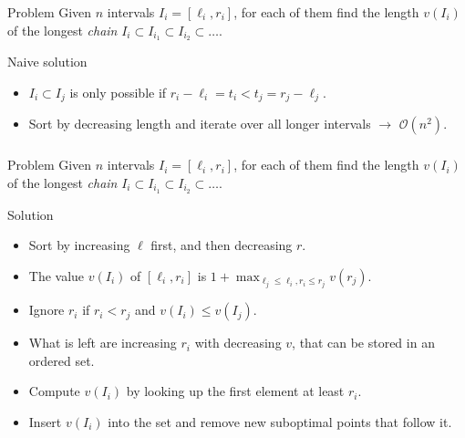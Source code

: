 \begin{frame}
    \frametitle{\problemtitle}
    \begin{block}{Problem}
      Given $n$ intervals $I_i=[\ell_i, r_i]$, for each of them find the length
      $v(I_i)$ of
      the longest \emph{chain} $I_i \subset I_{i_1} \subset I_{i_2}\subset \dots$.
    \end{block}
    \pause
    \begin{block}{Naive solution}
        \begin{itemize}
          \item<+-> $I_i \subset I_j$ is only possible if
             $r_i-\ell_i=t_i < t_j = r_j - \ell_j$.
          \item<+-> Sort by decreasing length and iterate over all longer
             intervals $\rightarrow$ $\mathcal O(n^2)$.
        \end{itemize}
    \end{block}
\end{frame}

\begin{frame}
    \frametitle{\problemtitle}
    \begin{block}{Problem}
      Given $n$ intervals $I_i=[\ell_i, r_i]$, for each of them find the length
      $v(I_i)$ of
      the longest \emph{chain} $I_i \subset I_{i_1} \subset I_{i_2}\subset \dots$.
    \end{block}
    \begin{block}{Solution}
        \begin{itemize}
          \item<+-> Sort by increasing $\ell$ first, and then decreasing $r$.
          \item<+-> The value $v(I_i)$ of $[\ell_i, r_i]$ is $1+\max_{\ell_j \leq \ell_i, r_i \leq r_j} v(r_j)$.
          \item<+-> Ignore $r_i$ if $r_i < r_j$ and $v(I_i) \leq v(I_j)$.
          \item<+-> What is left are increasing $r_i$ with decreasing $v$, that
             can be stored in an ordered set.
          \item<+-> Compute $v(I_i)$ by looking up the first element at least $r_i$.
          \item<+-> Insert $v(I_i)$ into the set and remove new suboptimal points
             that follow it.
        \end{itemize}
    \end{block}
\end{frame}

